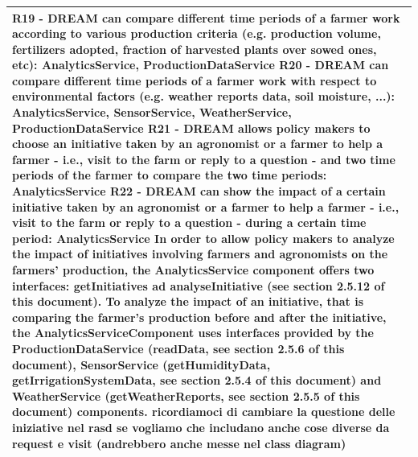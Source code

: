 \documentclass{article}
\begin{document}
\begin{longtable}[c]{|m{11.75cm}|}
    \textbf{R19 - DREAM can compare different time periods of a farmer work according to various production criteria (e.g. production volume, fertilizers adopted, fraction of harvested plants over sowed ones, etc): AnalyticsService, ProductionDataService
    \newline\newline
    R20 - DREAM can compare different time periods of a farmer work with respect to environmental factors (e.g. weather reports data, soil moisture, ...): AnalyticsService, SensorService, WeatherService, ProductionDataService
    \newline\newline
    R21 - DREAM allows policy makers to choose an initiative taken by an agronomist or a farmer to help a farmer - i.e., visit to the farm or reply to a question - and two time periods of the farmer to compare the two time periods: AnalyticsService
    \newline\newline
    R22 - DREAM can show the impact of a certain initiative taken by an agronomist or a farmer to help a farmer - i.e., visit to the farm or reply to a question - during a certain time period: AnalyticsService
    \newline\newline}
    In order to allow policy makers to analyze the impact of initiatives involving farmers and agronomists on the farmers' production, the AnalyticsService component offers two interfaces: getInitiatives ad analyseInitiative (see section 2.5.12 of this document). To analyze the impact of an initiative, that is comparing the farmer's production before and after the initiative, the AnalyticsServiceComponent uses interfaces provided by the ProductionDataService (readData, see section 2.5.6 of this document), SensorService (getHumidityData, getIrrigationSystemData, see section 2.5.4 of this document) and WeatherService (getWeatherReports, see section 2.5.5 of this document) components.
    \color{red}
    ricordiamoci di cambiare la questione delle iniziative nel rasd se vogliamo che includano anche cose diverse da request e visit (andrebbero anche messe nel class diagram)
    \color{black}\\
    \hline
    

\end{longtable}
\end{document}

